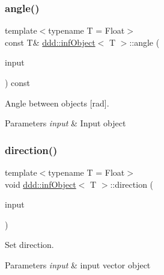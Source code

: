 \subsubsection{\texorpdfstring{angle()}{angle()}}
{\footnotesize\ttfamily template$<$typename T = Float$>$ \\
const T\& \hyperlink{classddd_1_1inf_object}{ddd\+::inf\+Object}$<$ T $>$\+::angle (\begin{DoxyParamCaption}\item[{const \hyperlink{classddd_1_1inf_object}{inf\+Object}$<$ T $>$ \&}]{input }\end{DoxyParamCaption}) const\hspace{0.3cm}{\ttfamily [inline]}}



Angle between objects \mbox{[}rad\mbox{]}. 


\begin{DoxyParams}{Parameters}
{\em input} & Input object \\
\hline
\end{DoxyParams}
\mbox{\label{classddd_1_1inf_object_a93dbc58a348a0408b945c3a7ab524135}} 
\subsubsection{\texorpdfstring{direction()}{direction()}}
{\footnotesize\ttfamily template$<$typename T = Float$>$ \\
void \hyperlink{classddd_1_1inf_object}{ddd\+::inf\+Object}$<$ T $>$\+::direction (\begin{DoxyParamCaption}\item[{const \hyperlink{classddd_1_1vector}{vector}$<$ T $>$ \&}]{input }\end{DoxyParamCaption})\hspace{0.3cm}{\ttfamily [inline]}}



Set direction. 


\begin{DoxyParams}{Parameters}
{\em input} & input vector object \\
\hline
\end{DoxyParams}
\mbox{\label{classddd_1_1inf_object_afb3d69d65ae6b664796a153c7c78c2bd}} 
